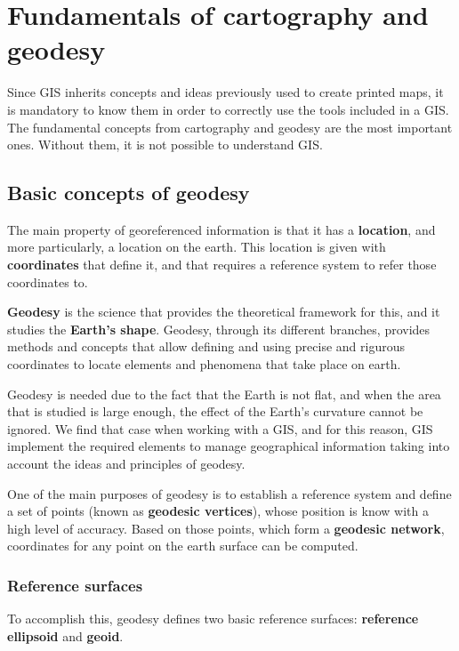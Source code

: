 
\chapter{Fundamentals of cartography and geodesy}

Since GIS inherits concepts and ideas previously used to create printed maps, it is mandatory to know them in order to correctly use the tools included in a GIS. The fundamental concepts from cartography and geodesy are the most important ones. Without them, it is not possible to understand GIS.


\section{Basic concepts of geodesy}
\pagestyle{fancy}

The main property of georeferenced information is that it has a \textbf{location}, and more particularly, a location on the earth. This location is given with \textbf{coordinates} that define it, and that requires a reference system to refer those coordinates to.

\textbf{Geodesy} is the science that provides the theoretical framework for this, and it studies the \textbf{Earth's shape}. Geodesy, through its different branches, provides methods and concepts that allow defining and using precise and rigurous coordinates to locate elements and phenomena that take place on earth.

Geodesy is needed due to the fact that the Earth is not flat, and when the area that is studied is large enough, the effect of the Earth's curvature cannot be ignored. We find that case when working with a GIS, and for this reason, GIS implement the required elements to manage geographical information taking into account the ideas and principles of geodesy.

One of the main purposes of geodesy is to establish a reference system and define a set of points (known as \textbf{geodesic vertices}), whose position is know with a high level of accuracy. Based on those points, which form a \textbf{geodesic network}, coordinates for any point on the earth surface can be computed.

\subsection{Reference surfaces}

To accomplish this, geodesy defines two basic reference surfaces: \textbf{reference ellipsoid} and \textbf{geoid}.

